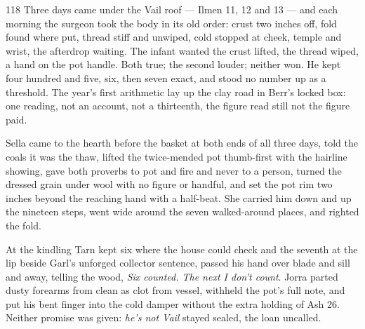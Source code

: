 
\scenebreak


\scenebreak


\scenebreak

\CRtailpiece
\begin{CRchronicle}{118}
Three days came under the Vail roof — Ilmen 11, 12 and 13 — and each morning the surgeon took the body in its old order: crust two inches off, fold found where put, thread stiff and unwiped, cold stopped at cheek, temple and wrist, the afterdrop waiting. The infant wanted the crust lifted, the thread wiped, a hand on the pot handle. Both true; the second louder; neither won. He kept four hundred and five, six, then seven exact, and stood no number up as a threshold. The year’s first arithmetic lay up the clay road in Berr’s locked box: one reading, not an account, not a thirteenth, the figure read still not the figure paid.

Sella came to the hearth before the basket at both ends of all three days, told the coals it was the thaw, lifted the twice-mended pot thumb-first with the hairline showing, gave both proverbs to pot and fire and never to a person, turned the dressed grain under wool with no figure or handful, and set the pot rim two inches beyond the reaching hand with a half-beat. She carried him down and up the nineteen steps, went wide around the seven walked-around places, and righted the fold.

At the kindling Tarn kept six where the house could check and the seventh at the lip beside Garl’s unforged collector sentence, passed his hand over blade and sill and away, telling the wood, \emph{Six counted. The next I don’t count}. Jorra parted dusty forearms from clean as clot from vessel, withheld the pot’s full note, and put his bent finger into the cold damper without the extra holding of Ash 26. Neither promise was given: \emph{he’s not Vail} stayed sealed, the loan uncalled.


\end{CRchronicle}
